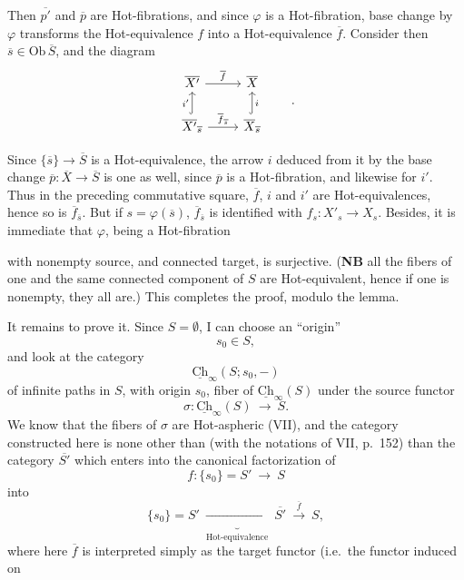 \documentclass[11pt]{article}
\newcommand{\printedpage}[1]{\marginpar{\footnotesize p.~#1}}
\newcommand{\msp}[1]{\marginpar{\footnotesize [#1]}}
\newcommand{\Ch}{\underline{\mathrm{Ch}}}
\newcommand{\Ob}{\mathrm{Ob}\,}
\begin{document}
Then $\overline{p'}$ and $\overline{p}$ are Hot-fibrations, and since $\varphi$ is a Hot-fibration, base change by $\varphi$ transforms the Hot-equivalence $f$ into a Hot-equivalence $\overline{f}$. Consider then $\overline{s} \in \Ob\overline{S}$, and the diagram
\[
\begin{tikzcd}
\overline{X'} \arrow[r, "\overline{f}"] & \overline{X} \\
\overline{X'}_{\overline{s}} \arrow[u, hook, "i'"] \arrow[r, "\overline{f}_{\overline{s}}"] & \overline{X}_{\overline{s}} \arrow[u, hook, "i"']
\end{tikzcd}
\qquad .
\]

\printedpage{6}

Since $\{\overline{s}\} \longrightarrow \overline{S}$ is a Hot-equivalence, the arrow $i$ deduced from it by the base change $\overline{p} : \overline{X} \longrightarrow \overline{S}$ is one as well, since $\overline{p}$ is a Hot-fibration, and likewise for $i'$. Thus in the preceding commutative square, $\overline{f}$, $i$ and $i'$ are Hot-equivalences, hence so is $\overline{f}_{\overline{s}}$. But if $s = \varphi(\overline{s})$, $\overline{f}_{\overline{s}}$ is identified with $f_s : X'_s \longrightarrow X_s$. Besides, it is immediate that $\varphi$, being a Hot-fibration

\msp{page 135}

with nonempty source, and connected target, is surjective. (\textbf{NB} all the fibers of one and the same connected component of $S$ are Hot-equivalent, hence if one is nonempty, they all are.) This completes the proof, modulo the lemma.

It remains to prove it. Since $S = \emptyset$, I can choose an ``origin''
\[
s_0 \in S,
\]
and look at the category
\[
\Ch_{\infty}(S; s_0, -)
\]
of infinite paths in $S$, with origin $s_0$, fiber of $\Ch_{\infty}(S)$ under the source functor
\[
\sigma : \Ch_{\infty}(S) \ \longrightarrow\ S.
\]
We know that the fibers of $\sigma$ are Hot-aspheric (VII), and the category constructed here is none other than (with the notations of VII, p.~152) than the category $\overline{S'}$ which enters into the canonical factorization of
\[
f : \{s_0\} = S' \ \longrightarrow\ S
\]
into
\[
\{s_0\} = S' \ \underbrace{\longrightarrow}_{\text{Hot-equivalence}}\ \overline{S'} \ \xrightarrow{\ \overline{f}\ }\ S,
\]
where here $\overline{f}$ is interpreted simply as the target functor (i.e.\ the functor induced on

\msp{page 136}
\end{document}
